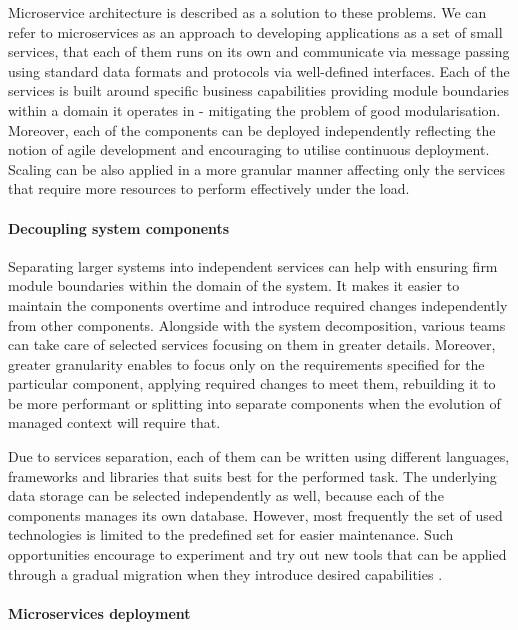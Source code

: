 Microservice architecture \cite{FowlerMicroservices} is described as a solution to these problems. We can refer to microservices as an approach to developing applications as a set of small services, that each of them runs on its own and communicate via message passing using standard data formats and protocols via well-defined interfaces. Each of the services is built around specific business capabilities providing module boundaries within a domain it operates in - mitigating the problem of good modularisation. Moreover, each of the components can be deployed independently reflecting the notion of agile development and encouraging to utilise continuous deployment. Scaling can be also applied in a more granular manner affecting only the services that require more resources to perform effectively under the load.

\paragraph{Decoupling system components}

Separating larger systems into independent services can help with ensuring firm module boundaries within the domain of the system. It makes it easier to maintain the components overtime and introduce required changes independently from other components. Alongside with the system decomposition, various teams can take care of selected services focusing on them in greater details. Moreover, greater granularity enables to focus only on the requirements specified for the particular component, applying required changes to meet them, rebuilding it to be more performant or splitting into separate components when the evolution of managed context will require that.

Due to services separation, each of them can be written using different languages, frameworks and libraries that suits best for the performed task. The underlying data storage can be selected independently as well, because each of the components manages its own database. However, most frequently the set of used technologies is limited to the predefined set for easier maintenance. Such opportunities encourage to experiment and try out new tools that can be applied through a gradual migration when they introduce desired capabilities \cite{FowlerMicroservicesTradeoffs}.

\paragraph{Microservices deployment}

